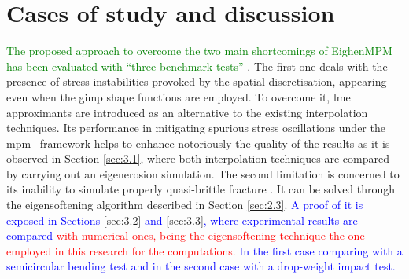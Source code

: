 \documentclass[preprint,12pt,a4paper]{elsarticle}
\newcommand{\PNA}[1]{
  \textcolor{red}{{#1}}
}
\newcommand{\MMP}[1]{
  \textcolor{blue}{{#1}}
}
\newcommand{\DM}[1]{
  \textcolor{green}{{#1}}
}
\begin{document}
\section{Cases of study and discussion}
\label{sec:3}

\DM{The proposed approach to overcome the two main shortcomings of
  EighenMPM \cite{Zhang_EE_2020} has been evaluated with ``three
  benchmark tests''}.
The first one deals with the presence of stress
instabilities provoked by the spatial discretisation, appearing even when the \acrshort{gimp} shape functions are employed. To overcome it, \acrshort{lme}
approximants are introduced as an alternative to the existing interpolation techniques. Its
performance in mitigating spurious stress oscillations under the \acrshort{mpm}~\cite{Wobbes2020,Molinos2020} framework helps to enhance
notoriously the quality of the results as it is observed in Section
\ref{sec:3.1}, where both interpolation techniques
are compared by carrying out an eigenerosion simulation. The second
limitation is concerned to its inability to simulate properly quasi-brittle
fracture \cite{Navas_2018_ES}. It can be solved through the
eigensoftening algorithm described in Section \ref{sec:2.3}.\MMP{A proof
of it is exposed in Sections \ref{sec:3.2} and \ref{sec:3.3}, where experimental results
are compared \PNA{with numerical ones, being the eigensoftening technique the one employed in this research for the
computations.} In the first case comparing with a semicircular bending
test and in the second case with a drop-weight impact test.}
\end{document}

